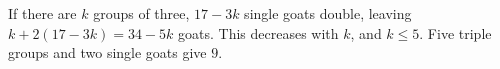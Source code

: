 If there are $k$ groups of three, $17-3k$ single goats double, leaving $k+2(17-3k)=34-5k$ goats. This decreases with $k$, and $k\le5$. Five triple groups and two single goats give $\boxed9$.
